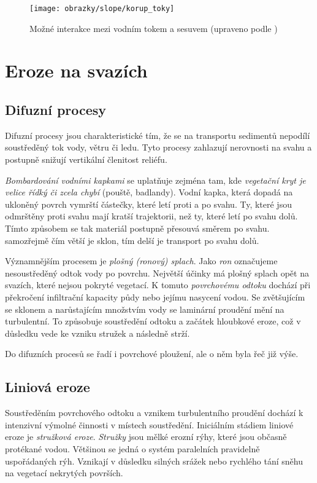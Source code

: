 \begin{figure}[h]
	\centering
	\texttt{[image: obrazky/slope/korup\_toky]}
	\caption{Možné interakce mezi vodním tokem a sesuvem (upraveno podle \textcite{korupGeomorphicImprintLandslides2005})}
	\label{fig:koruptoky}
\end{figure}



\section{Eroze na svazích}

\subsection{Difuzní procesy}
Difuzní procesy jsou charakteristické tím, že se na transportu sedimentů nepodílí soustředěný tok vody, větru či ledu. Tyto procesy zahlazují nerovnosti na svahu a postupně snižují vertikální členitost reliéfu. 

\emph{Bombardování vodními kapkami} se uplatňuje zejména tam, kde \emph{vegetační kryt je velice řídký či zcela chybí} (pouště, badlandy). Vodní kapka, která dopadá na ukloněný povrch vymrští částečky, které letí proti a po svahu. Ty, které jsou odmrštěny proti svahu mají kratší trajektorii, než ty, které letí po svahu dolů. Tímto způsobem se tak materiál postupně přesouvá směrem po svahu. samozřejmě čím větší je sklon, tím delší je transport po svahu dolů.

Významnějším procesem je \emph{plošný (ronový) splach}. Jako \emph{ron} označujeme nesoustředěný odtok vody po povrchu. Největší účinky má plošný splach opět na svazích, které nejsou pokryté vegetací. K tomuto \emph{povrchovému odtoku} dochází při překročení infiltrační kapacity půdy nebo jejímu nasycení vodou. Se zvětšujícím se sklonem a narůstajícím množstvím vody se laminární proudění mění na turbulentní. To způsobuje soustředění odtoku a začátek hloubkové eroze, což v důsledku vede ke vzniku stružek a následně strží.

Do difuzních procesů se řadí i povrchové ploužení, ale o něm byla řeč již výše.

\subsection{Liniová eroze}
Soustředěním povrchového odtoku a vznikem turbulentního proudění dochází k intenzivní výmolné činnosti v místech soustředění. Iniciálním stádiem liniové eroze je \emph{stružková eroze}. \emph{Stružky} jsou mělké erozní rýhy, které jsou občasně protékané vodou. Většinou se jedná o systém paralelních pravidelně uspořádaných rýh. Vznikají v důsledku silných srážek nebo rychlého tání sněhu na vegetací nekrytých površích. 

